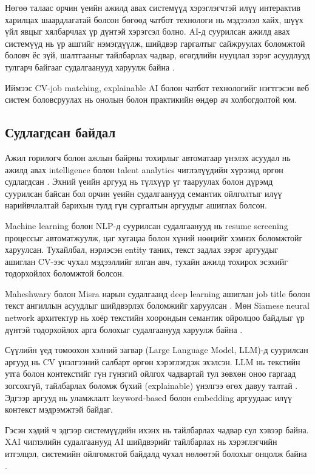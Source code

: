 Нөгөө талаас орчин үеийн ажилд авах системүүд хэрэглэгчтэй илүү интерактив харилцах шаардлагатай болсон бөгөөд чатбот технологи нь мэдээлэл хайх, шүүх үйл явцыг хялбарчлах үр дүнтэй хэрэгсэл болно. AI-д суурилсан ажилд авах системүүд нь үр ашгийг нэмэгдүүлж, шийдвэр гаргалтыг сайжруулах боломжтой боловч ёс зүй, шалтгааныг тайлбарлах чадвар, өгөгдлийн нууцлал зэрэг асуудлууд тулгарч байгааг судалгаанууд харуулж байна .

Иймээс CV-job matching, explainable AI болон чатбот технологийг нэгтгэсэн веб систем боловсруулах нь онолын болон практикийн өндөр ач холбогдолтой юм.

\subsection*{Судлагдсан байдал}

Ажил горилогч болон ажлын байрны тохирлыг автоматаар үнэлэх асуудал нь ажилд авах intelligence болон talent analytics чиглэлүүдийн хүрээнд өргөн судлагдсан \cite{kristof2005personjob}. Эхний үеийн аргууд нь түлхүүр үг тааруулах болон дүрэмд суурилсан байсан бол орчин үеийн судалгаанууд семантик ойлголтыг илүү нарийвчлалтай барихын тулд гүн сургалтын аргуудыг ашиглах болсон.

Machine learning болон NLP-д суурилсан судалгаанууд нь resume screening процессыг автоматжуулж, цаг хугацаа болон хүний нөөцийг хэмнэх боломжтойг харуулсан. Тухайлбал, нэрлэсэн entity таних, текст задлах зэрэг аргуудыг ашиглан CV-ээс чухал мэдээллийг ялган авч, тухайн ажилд тохирох эсэхийг тодорхойлох боломжтой болсон.

Maheshwary болон Misra нарын судалгаанд deep learning ашиглан job title болон текст ангиллын асуудлыг шийдвэрлэх боломжийг харуулсан \cite{maheshwary2018job}. Мөн Siamese neural network архитектур нь хоёр текстийн хоорондын семантик ойролцоо байдлыг үр дүнтэй тодорхойлох арга болохыг судалгаанууд харуулж байна \cite{resume_matching_siamese}.

Сүүлийн үед томоохон хэлний загвар (Large Language Model, LLM)-д суурилсан аргууд нь CV үнэлгээний салбарт өргөн хэрэглэгдэж эхэлсэн. LLM нь текстийн утга болон контекстийг гүн гүнзгий ойлгох чадвартай тул зөвхөн оноо гаргаад зогсохгүй, тайлбарлах боломж бүхий (explainable) үнэлгээ өгөх давуу талтай \cite{arrieta2020xai}. Эдгээр аргууд нь уламжлалт keyword-based болон embedding аргуудаас илүү контекст мэдрэмжтэй байдаг.

Гэсэн хэдий ч эдгээр системүүдийн ихэнх нь тайлбарлах чадвар сул хэвээр байна. XAI чиглэлийн судалгаанууд AI шийдвэрийг тайлбарлах нь хэрэглэгчийн итгэлцэл, системийн ойлгомжтой байдалд чухал нөлөөтэй болохыг онцолж байна \cite{arrieta2020xai,adadi2018xai}.

